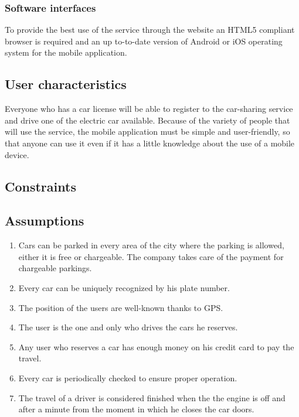 \subsubsection{Software interfaces}
To provide the best use of the service through the website an HTML5 compliant browser is required and an up to-to-date version of Android or iOS operating system for the mobile application.





\subsection{User characteristics}
Everyone who has a car license will be able to register to the car-sharing service and drive one of the electric car available.
Because of the variety of people that will use the service, the mobile application must be simple and user-friendly, so that anyone can use it even if it has a little knowledge about the use of a mobile device.

\subsection{Constraints}



\subsection{Assumptions}
\begin{enumerate}
	\item Cars can be parked in every area of the city where the parking is allowed, either it is free or chargeable. The company 		                    takes care of the payment for chargeable parkings. 
	\item Every car can be uniquely recognized by his plate number.
	\item The position of the users are well-known thanks to GPS.
	\item The user is the one and only who drives the cars he reserves.
	\item Any user who reserves a car has enough money on his credit card to pay the travel.
	\item Every car is periodically checked to ensure proper operation.
	\item The travel of a driver is considered finished when the the engine is off and after a minute from the moment in which he closes the car doors.
\end{enumerate}

